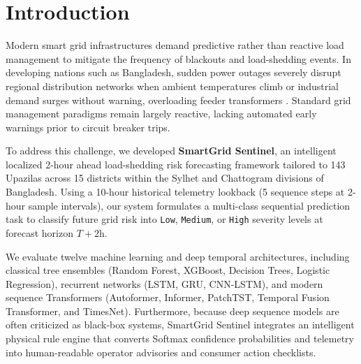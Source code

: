 \section{Introduction}
Modern smart grid infrastructures demand predictive rather than reactive load management to mitigate the frequency of blackouts and load-shedding events. In developing nations such as Bangladesh, sudden power outages severely disrupt regional distribution networks when ambient temperatures climb or industrial demand surges without warning, overloading feeder transformers \cite{bpdb2023report}. Standard grid management paradigms remain largely reactive, lacking automated early warnings prior to circuit breaker trips.

To address this challenge, we developed \textbf{SmartGrid Sentinel}, an intelligent localized 2-hour ahead load-shedding risk forecasting framework tailored to 143 Upazilas across 15 districts within the Sylhet and Chattogram divisions of Bangladesh. Using a 10-hour historical telemetry lookback (5 sequence steps at 2-hour sample intervals), our system formulates a multi-class sequential prediction task to classify future grid risk into \texttt{Low}, \texttt{Medium}, or \texttt{High} severity levels at forecast horizon $T+2\text{h}$.

We evaluate twelve machine learning and deep temporal architectures, including classical tree ensembles (Random Forest, XGBoost, Decision Trees, Logistic Regression), recurrent networks (LSTM, GRU, CNN-LSTM), and modern sequence Transformers (Autoformer, Informer, PatchTST, Temporal Fusion Transformer, and TimesNet). Furthermore, because deep sequence models are often criticized as black-box systems, SmartGrid Sentinel integrates an intelligent physical rule engine that converts Softmax confidence probabilities and telemetry into human-readable operator advisories and consumer action checklists.

